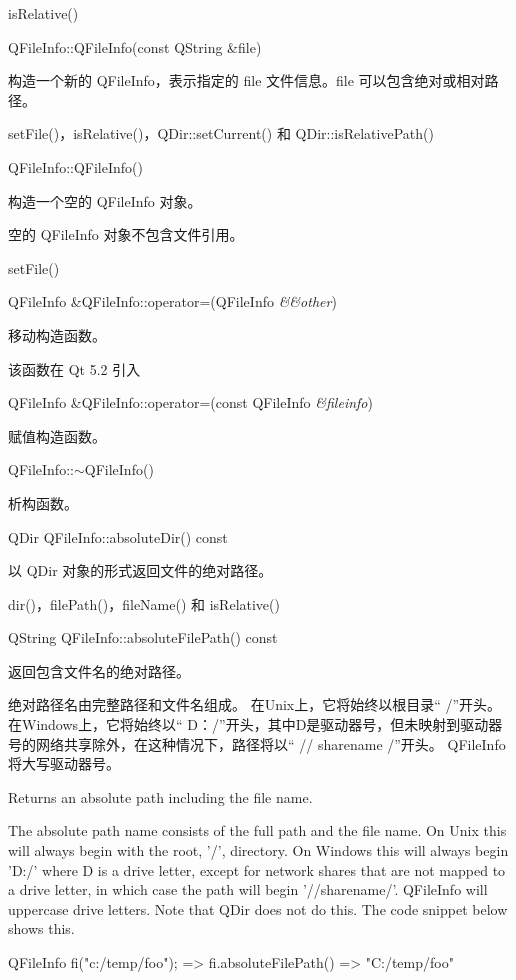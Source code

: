 \begin{seeAlso}
 isRelative()
\end{seeAlso}

QFileInfo::QFileInfo(const QString \&file)

构造一个新的 QFileInfo，表示指定的 file 文件信息。file 可以包含绝对或相对路径。


\begin{seeAlso}
setFile()，isRelative()，QDir::setCurrent() 和
QDir::isRelativePath()
\end{seeAlso}

QFileInfo::QFileInfo()

构造一个空的 QFileInfo 对象。

\begin{notice}
空的 QFileInfo 对象不包含文件引用。
\end{notice}


\begin{seeAlso}
 setFile()
\end{seeAlso}


QFileInfo \&QFileInfo::operator=(QFileInfo \emph{\&\&other})

移动构造函数。

该函数在 Qt 5.2 引入

QFileInfo \&QFileInfo::operator=(const QFileInfo \emph{\&fileinfo})

赋值构造函数。

QFileInfo::$\sim$QFileInfo()

析构函数。

QDir QFileInfo::absoluteDir() const

以 QDir 对象的形式返回文件的绝对路径。


\begin{seeAlso}
dir()，filePath()，fileName() 和 isRelative()
\end{seeAlso}

QString QFileInfo::absoluteFilePath() const

返回包含文件名的绝对路径。

绝对路径名由完整路径和文件名组成。 在Unix上，它将始终以根目录“ /”开头。 
在Windows上，它将始终以“ D：/”开头，其中D是驱动器号，但未映射到驱动器号的网络共享除外，在这种情况下，路径将以“ // sharename /”开头。 QFileInfo 将大写驱动器号。

Returns an absolute path including the file name.

The absolute path name consists of the full path and the file name. On
Unix this will always begin with the root, '/', directory. On Windows
this will always begin 'D:/' where D is a drive letter, except for
network shares that are not mapped to a drive letter, in which case
the path will begin '//sharename/'. QFileInfo will uppercase drive
letters. Note that QDir does not do this. The code snippet below shows
this.

\begin{cppcode}
QFileInfo fi("c:/temp/foo"); => fi.absoluteFilePath() => "C:/temp/foo"
\end{cppcode}